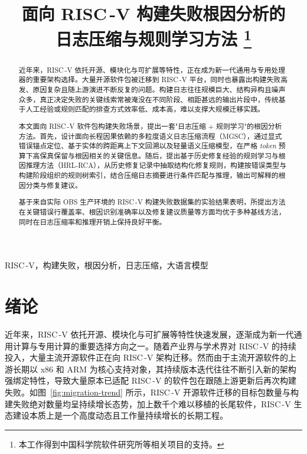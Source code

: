 \documentclass[10pt,conference]{IEEEtran}
\begin{document}
\title{面向 RISC\,-V 构建失败根因分析的\\日志压缩与规则学习方法%
\thanks{本工作得到中国科学院软件研究所等相关项目的支持。}}

\author{%
}

\maketitle

\begin{abstract}
近年来，RISC\,-V 依托开源、模块化与可扩展等特性，正在成为新一代通用与专用处理器的重要架构选择。大量开源软件包被迁移到 RISC\,-V 平台，同时也暴露出构建失败高发、原因复杂且随上游演进不断反复的问题。构建日志往往规模巨大、结构异构且噪声众多，真正决定失败的关键线索常被淹没在不同阶段、相距甚远的输出片段中，传统基于人工经验或规则匹配的排查方式效率低、成本高，难以支撑大规模迁移实践。

本文面向 RISC\,-V 软件包构建失败场景，提出一套"日志压缩 + 规则学习"的根因分析方法。首先，设计面向长程因果依赖的多粒度语义日志压缩流程（MGSC），通过显式错误锚点定位、基于实体的跨距离上下文回溯以及轻量语义压缩模型，在严格 \emph{token} 预算下高保真保留与根因相关的关键信息。随后，提出基于历史修复经验的规则学习与根因推理方法（HRL-RCA），从历史修复记录中抽取结构化修复规则，构建按错误类型与构建阶段组织的规则树索引，结合压缩日志摘要进行条件匹配与推理，输出可解释的根因分类与修复建议。

基于来自实际 OBS 生产环境的 RISC\,-V 构建失败数据集的实验结果表明，所提出方法在关键错误行覆盖率、根因识别准确率以及修复建议质量等方面均优于多种基线方法，同时在日志压缩率和推理开销上保持良好平衡。
\end{abstract}

\begin{IEEEkeywords}
RISC\,-V，构建失败，根因分析，日志压缩，大语言模型
\end{IEEEkeywords}

\section{绪论}

近年来，RISC\,-V 依托开源、模块化与可扩展等特性快速发展\cite{r1,r4}，逐渐成为新一代通用计算与专用计算的重要选择方向之一。随着产业界与学术界对 RISC\,-V 的持续投入，大量主流开源软件正在向 RISC\,-V 架构迁移\cite{r16}。然而由于主流开源软件的上游长期以 x86 和 ARM 为核心支持对象，其持续版本迭代往往不断引入新的架构强绑定特性，导致大量原本已适配 RISC\,-V 的软件包在跟随上游更新后再次构建失败。如图~\ref{fig:migration-trend} 所示，RISC\,-V 开源软件迁移的目标包数量与构建失败绝对数量均呈持续增长态势，加上数千个难以移植的长尾软件，RISC\,-V 生态建设本质上是一个高度动态且工作量持续增长的长期工程。
\end{document}
